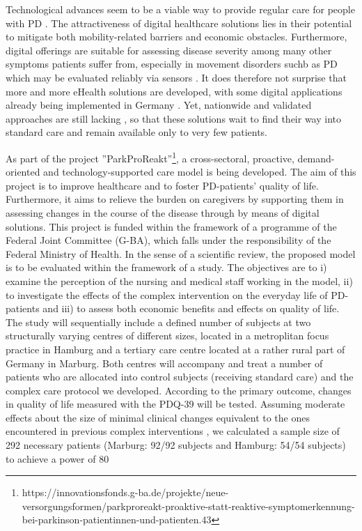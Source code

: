 \documentclass[number,12pt,review]{elsarticle}
\begin{document}
Technological advances seem to be a viable way to provide regular care for people with \ac{PD} \citep{achey2014past}. The attractiveness of digital healthcare solutions lies in their potential to mitigate both mobility-related barriers and economic obstacles. Furthermore, digital offerings are suitable for assessing disease severity among many other symptoms patients suffer from, especially in movement disorders suchb as \ac{PD} which may be evaluated reliably via sensors \citep{kleinholdermann2019remote, tabatabaei2020machine, Kleinholdermann2021-st}. It does therefore not surprise that more and more eHealth solutions are developed, with some digital applications already being implemented in Germany \citep{Stangl2020-na}. Yet, nationwide and validated approaches are still lacking \citep{van2020building}, so that these solutions wait to find their way into standard care and remain available only to very few patients.

As part of the project ”ParkProReakt”\footnote{https://innovationsfonds.g-ba.de/projekte/neue-versorgungsformen/parkproreakt-proaktive-statt-reaktive-symptomerkennung-bei-parkinson-patientinnen-und-patienten.43}, a cross-sectoral, proactive, demand-oriented and technology-supported care model is being developed. 
The aim of this project is to improve healthcare and to foster \ac{PD}-patients' quality of life. Furthermore, it aims to relieve the burden on caregivers by supporting them in assessing changes in the course of the disease through by means of digital solutions. This project is funded within the framework of a programme of the Federal Joint Committee (\ac{G-BA}), which falls under the responsibility of the Federal Ministry of Health. In the sense of a scientific review, the proposed model is to be evaluated within the framework of a study. The objectives are to i) examine the perception of the nursing and medical staff working in the model, ii) to investigate the effects of the complex intervention on the everyday life of \ac{PD}-patients and iii) to assess both economic benefits and effects on quality of life. The study will sequentially include a defined number of subjects at two structurally varying centres of different sizes, located in a metroplitan focus practice in Hamburg and a tertiary care centre located at a rather rural part of Germany in Marburg. Both centres will accompany and treat a number of patients who are allocated into control subjects (receiving standard care) and the complex care protocol we developed. According to the primary outcome, changes in quality of life measured with the \ac{PDQ-39} \citep{jenkinson1997parkinson} will be tested. Assuming moderate effects about the size of minimal clinical changes \citep{horvath2017changes} equivalent to the ones encountered in previous complex interventions \citep{Butterfield2017-uc, Mestre2021-od}, we calculated a sample size of 292 necessary patients (Marburg: 92/92 subjects and Hamburg: 54/54 subjects) to achieve a power of 80%
\end{document}
